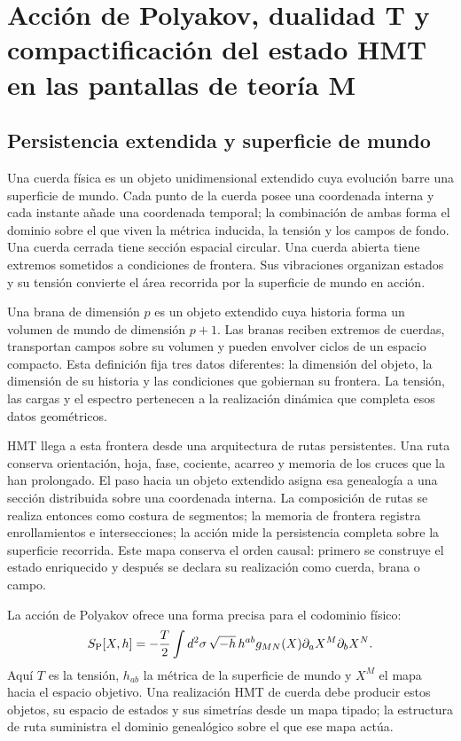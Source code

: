 \chapter{Acción de Polyakov, dualidad T y compactificación del estado HMT en las pantallas de teoría M}
\label{chap:teoria-m}

\section{Persistencia extendida y superficie de mundo}

Una cuerda física es un objeto unidimensional extendido cuya evolución barre
una superficie de mundo. Cada punto de la cuerda posee una coordenada interna
y cada instante añade una coordenada temporal; la combinación de ambas forma
el dominio sobre el que viven la métrica inducida, la tensión y los campos de
fondo. Una cuerda cerrada tiene sección espacial circular. Una cuerda abierta
tiene extremos sometidos a condiciones de frontera. Sus vibraciones organizan
estados y su tensión convierte el área recorrida por la superficie de mundo en
acción.

Una brana de dimensión \(p\) es un objeto extendido cuya historia forma un
volumen de mundo de dimensión \(p+1\). Las branas reciben extremos de cuerdas,
transportan campos sobre su volumen y pueden envolver ciclos de un espacio
compacto. Esta definición fija tres datos diferentes: la dimensión del objeto,
la dimensión de su historia y las condiciones que gobiernan su frontera. La
tensión, las cargas y el espectro pertenecen a la realización dinámica que
completa esos datos geométricos.

HMT llega a esta frontera desde una arquitectura de rutas persistentes. Una
ruta conserva orientación, hoja, fase, cociente, acarreo y memoria de los
cruces que la han prolongado. El paso hacia un objeto extendido asigna esa
genealogía a una sección distribuida sobre una coordenada interna. La
composición de rutas se realiza entonces como costura de segmentos; la memoria
de frontera registra enrollamientos e intersecciones; la acción mide la
persistencia completa sobre la superficie recorrida. Este mapa conserva el
orden causal: primero se construye el estado enriquecido y después se declara
su realización como cuerda, brana o campo.

La acción de Polyakov ofrece una forma precisa para el codominio físico:
\[
 S_{\rm P}[X,h]
 =-\frac{T}{2}\int d^2\sigma\,
 \sqrt{-h}\,h^{ab}g_{MN}(X)
 \partial_aX^M\partial_bX^N.
\]
Aquí \(T\) es la tensión, \(h_{ab}\) la métrica de la superficie de mundo y
\(X^M\) el mapa hacia el espacio objetivo. Una realización HMT de cuerda debe
producir estos objetos, su espacio de estados y sus simetrías desde un mapa
tipado; la estructura de ruta suministra el dominio genealógico sobre el que
ese mapa actúa.

